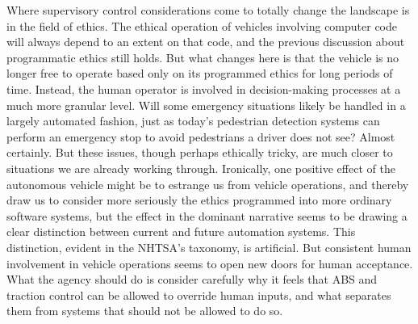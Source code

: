 Where supervisory control considerations come to totally change
the landscape is in the field of ethics. The ethical operation of
vehicles involving computer code will always depend to an extent on
that code, and the previous discussion about programmatic ethics still
holds. But what changes here is that the vehicle is no longer free to
operate based only on its programmed ethics for long periods of time.
Instead, the human operator is involved in decision-making processes
at a much more granular level. Will some emergency situations likely
be handled in a largely automated fashion, just as today's pedestrian
detection systems can perform an emergency stop to avoid pedestrians a
driver does not see? Almost certainly. But these issues, though
perhaps ethically tricky, are much closer to situations we are already
working through. Ironically, one positive effect of the autonomous vehicle
might be to estrange us from vehicle operations, and thereby draw us
to consider more seriously the ethics programmed into more ordinary software
systems, but the effect in the dominant narrative seems to be drawing a
clear distinction between current and future automation systems. This
distinction, evident in the NHTSA's taxonomy, is artificial. But
consistent human involvement in vehicle operations seems to open new
doors for human acceptance. What the agency should do is consider carefully why it feels that
ABS and traction control can be allowed to override human inputs, and
what separates them from systems that should not be allowed to do so.


